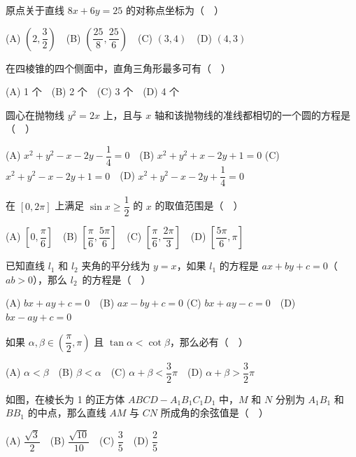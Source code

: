 \begin{question}
原点关于直线 \(8x+6y=25\) 的对称点坐标为（　）

(A) \(\left(2,\dfrac{3}{2}\right)\)　(B) \(\left(\dfrac{25}{8},\dfrac{25}{6}\right)\)　(C) \((3,4)\)　(D) \((4,3)\)

\end{question}
\begin{question}
在四棱锥的四个侧面中，直角三角形最多可有（　）

(A) 1 个　(B) 2 个　(C) 3 个　(D) 4 个

\end{question}
\begin{question}
圆心在抛物线 \(y^2=2x\) 上，且与 \(x\) 轴和该抛物线的准线都相切的一个圆的方程是（　）

(A) \(x^2+y^2-x-2y-\dfrac{1}{4}=0\)　(B) \(x^2+y^2+x-2y+1=0\)
(C) \(x^2+y^2-x-2y+1=0\)　(D) \(x^2+y^2-x-2y+\dfrac{1}{4}=0\)

\end{question}
\begin{question}
在 \([0,2\pi]\) 上满足 \(\sin x\geqslant\dfrac{1}{2}\) 的 \(x\) 的取值范围是（　）

(A) \(\left[0,\dfrac{\pi}{6}\right]\)　(B) \(\left[\dfrac{\pi}{6},\dfrac{5\pi}{6}\right]\)　(C) \(\left[\dfrac{\pi}{6},\dfrac{2\pi}{3}\right]\)　(D) \(\left[\dfrac{5\pi}{6},\pi\right]\)

\end{question}
\begin{question}
已知直线 \(l_1\) 和 \(l_2\) 夹角的平分线为 \(y=x\)，如果 \(l_1\) 的方程是 \(ax+by+c=0\)（\(ab>0\)），那么 \mbox{\(l_2\) 的方程是（　）}

(A) \(bx+ay+c=0\)　(B) \(ax-by+c=0\)
(C) \(bx+ay-c=0\)　(D) \(bx-ay+c=0\)

\end{question}
\begin{question}
如果 \(\alpha,\beta\in\left(\dfrac{\pi}{2},\pi\right)\) 且 \(\tan\alpha<\cot\beta\)，那么必有（　）

(A) \(\alpha<\beta\)　(B) \(\beta<\alpha\)　(C) \(\alpha+\beta<\dfrac{3}{2}\pi\)　(D) \(\alpha+\beta>\dfrac{3}{2}\pi\)

\Needspace{0.4\textheight}
\end{question}
\begin{question}
如图，在棱长为 1 的正方体 \(ABCD-A_1B_1C_1D_1\) 中，\(M\) 和 \(N\) 分别为 \(A_1B_1\) 和 \(BB_1\) 的中点，那么直线 \(AM\) 与 \(CN\) 所成角的余弦值是（　）
\nopagebreak[4]
\begin{center}\end{center}
\nopagebreak[4]
(A) \(\dfrac{\sqrt{3}}{2}\)　(B) \(\dfrac{\sqrt{10}}{10}\)　(C) \(\dfrac{3}{5}\)　(D) \(\dfrac{2}{5}\)

\end{question}

